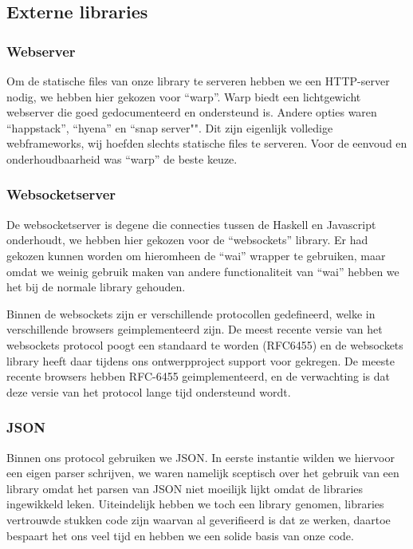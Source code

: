 \subsection{Externe libraries}
\label{subsec:externe_libraries}

\subsubsection{Webserver}
Om de statische files van onze library te serveren hebben we een HTTP-server nodig, we hebben hier gekozen voor ``warp''. Warp biedt een lichtgewicht webserver die goed gedocumenteerd en ondersteund is. Andere opties waren ``happstack'', ``hyena'' en ``snap server"". Dit zijn eigenlijk volledige webframeworks, wij hoefden slechts statische files te serveren. Voor de eenvoud en onderhoudbaarheid was ``warp'' de beste keuze.

\subsubsection{Websocketserver}
De websocketserver is degene die connecties tussen de Haskell en Javascript onderhoudt, we hebben hier gekozen voor de ``websockets'' library. Er had gekozen kunnen worden om hieromheen de ``wai'' wrapper te gebruiken, maar omdat we weinig gebruik maken van andere functionaliteit van ``wai'' hebben we het bij de normale library gehouden.

Binnen de websockets zijn er verschillende protocollen gedefineerd, welke in verschillende browsers geimplementeerd zijn. De meest recente versie van het websockets protocol poogt een standaard te worden (RFC6455) en de websockets library heeft daar tijdens ons ontwerpproject support voor gekregen. De meeste recente browsers hebben RFC-6455 geimplementeerd, en de verwachting is dat deze versie van het protocol lange tijd ondersteund wordt.

\subsubsection{JSON}
Binnen ons protocol gebruiken we JSON. In eerste instantie wilden we hiervoor een eigen parser schrijven, we waren namelijk sceptisch over het gebruik van een library omdat het parsen van JSON niet moeilijk lijkt omdat de libraries ingewikkeld leken. Uiteindelijk hebben we toch een library genomen, libraries vertrouwde stukken code zijn waarvan al geverifieerd is dat ze werken, daartoe bespaart het ons veel tijd en hebben we een solide basis van onze code.

